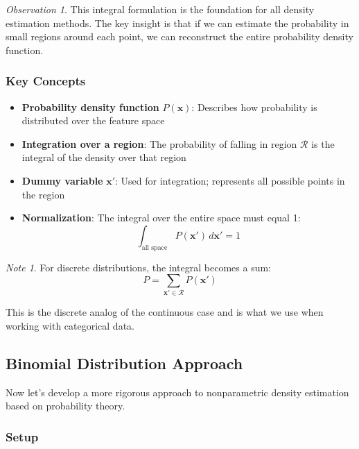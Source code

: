 \documentclass[11pt,a4paper]{article}
\theoremstyle{definition}
\theoremstyle{plain}
\theoremstyle{remark}
\newtheorem*{remark}{Note}
\newtheorem*{observation}{Observation}
\begin{document}
\begin{observation}
This integral formulation is the foundation for all density estimation methods. The key insight is that if we can estimate the probability in small regions around each point, we can reconstruct the entire probability density function.
\end{observation}

\subsubsection{Key Concepts}

\begin{itemize}
    \item \textbf{Probability density function} $P(\mathbf{x})$: Describes how probability is distributed over the feature space
    
    \item \textbf{Integration over a region}: The probability of falling in region $\mathcal{R}$ is the integral of the density over that region
    
    \item \textbf{Dummy variable} $\mathbf{x}'$: Used for integration; represents all possible points in the region
    
    \item \textbf{Normalization}: The integral over the entire space must equal 1:
    \[
    \int_{\text{all space}} P(\mathbf{x}') \, d\mathbf{x}' = 1
    \]
\end{itemize}

\begin{remark}
For discrete distributions, the integral becomes a sum:
\[
P = \sum_{\mathbf{x}' \in \mathcal{R}} P(\mathbf{x}')
\]

This is the discrete analog of the continuous case and is what we use when working with categorical data.
\end{remark}

\subsection{Binomial Distribution Approach}

Now let's develop a more rigorous approach to nonparametric density estimation based on probability theory.

\subsubsection{Setup}
\end{document}
